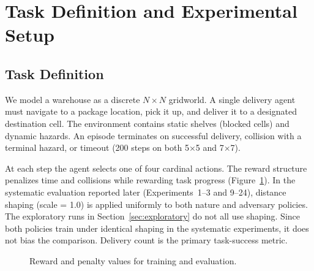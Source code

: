 \documentclass[sigconf]{aamas}
\begin{document}

\section{Task Definition and Experimental Setup}

\subsection{Task Definition}

We model a warehouse as a discrete $N\times N$ gridworld. A single delivery agent
must navigate to a package location, pick it up, and deliver it to a designated
destination cell. The environment contains static shelves (blocked cells) and
dynamic hazards. An episode terminates on successful delivery, collision with a
terminal hazard, or timeout (200 steps on both 5$\times$5 and 7$\times$7).

At each step the agent selects one of four cardinal actions. The reward structure penalizes time and collisions while rewarding task progress (Figure~\ref{fig:rewards}). In the systematic evaluation reported later (Experiments~1--3 and 9--24), distance shaping (scale = 1.0) is applied uniformly to both nature and adversary policies. The exploratory runs in Section~\ref{sec:exploratory} do not all use shaping. Since both policies train under identical shaping in the systematic experiments, it does not bias the comparison. Delivery count is the primary task-success metric. 

\begin{figure}[H]
  \centering
  \caption{Reward and penalty values for training and evaluation.}
  \label{fig:rewards}
\end{figure}
\end{document}

